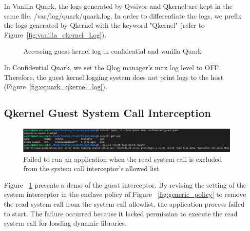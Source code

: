 In Vanilla Quark, the logs generated by Qvsivor and Qkernel are kept in the same file, /var/log/quark/quark.log. In order to differentiate the logs, we prefix the logs generated by Qkernel with the keyword "Qkernel" (refer to Figure~\ref{fig:vanilla_qkernel_Log}).
\begin{figure}[!htb]


  
    \caption[Accessing guest kernel log in confidential and vanilla Quark]{Accessing guest kernel log in confidential and vanilla Quark}
\end{figure}


In Confidential Quark, we set the Qlog manager's max log level to OFF. Therefore, the guest kernel logging system does not print logs to the host (Figure~\ref{fig:cquark_qkernel_log}).

\subsection{Qkernel Guest System Call Interception}

\begin{figure}[!htb]
    \centering
    \includegraphics[width=1\textwidth]{images/application_failed_to_start_due_to_syscall_interceptor.png}
    \caption[Failed to run an application when the read system call is excluded from the system call interceptor's allowed list]{Failed to run an application when the read system call is excluded from the system call interceptor's allowed list}
    \label{fig:application_failed_to_start_due_to_syscall_interceptor}
\end{figure}


Figure ~\ref{fig:application_failed_to_start_due_to_syscall_interceptor} presents a demo of the guest interceptor. By revising the setting of the system interceptor in the enclave policy of Figure ~\ref{fig:generic_policy} to remove the read system call from the system call allowlist, 
the application process failed to start. The failure occurred because it lacked permission to execute the read system call for loading dynamic libraries.

